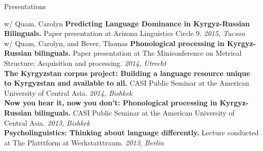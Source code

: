 \documentclass{resume} %
\begin{document}



\vspace{.8cm}



\begin{rSection}{Presentations}

{w/ Quam, Carolyn} {\bf Predicting Language Dominance in Kyrgyz-Russian Bilinguals.} {Paper presentation at Arizona Linguistics Circle 9.} \hfill {\em 2015, Tucson} \\

{w/ Quam, Carolyn, and Bever, Thomas} {\bf Phonological processing in Kyrgyz-Russian bilinguals.} {Paper presentation at The Miniconference on Metrical Structure: Acquisition and processing.} \hfill {\em 2014, Utrecht} \\

{\bf The Kyrgyzstan corpus project: Building a language resource unique to Kyrgyzstan and available to all.} {CASI Public Seminar at the American University of Central Asia.} \hfill {\em 2014, Bishkek} \\

{\bf Now you hear it, now you don’t: Phonological processing in Kyrgyz-Russian bilinguals.} {CASI Public Seminar at the American University of Central Asia.} \hfill {\em 2013, Bishkek} \\

{\bf Psycholinguistics: Thinking about language differently.} {Lecture conducted at The Platttform at Werkstatttraum.} \hfill {\em 2013, Berlin} \\


\end{rSection}



\vspace{1.0cm}
\end{document}
